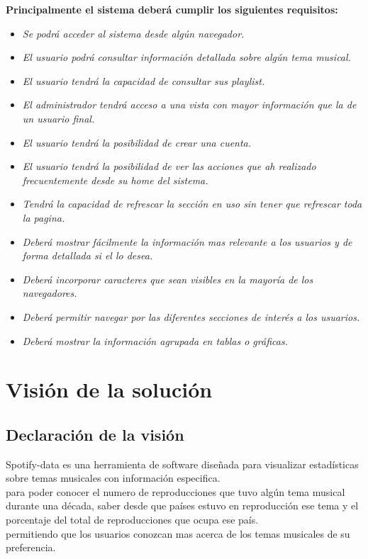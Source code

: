 \documentclass[12pt,a4paper]{book}
\begin{document}
\textbf{Principalmente el sistema deberá cumplir los siguientes requisitos: }
\vspace{0.5 cm}
\begin{itemize}
\item \textit{Se podrá acceder al sistema desde algún navegador.}
\item \textit{El usuario podrá consultar información detallada sobre algún tema musical.}
\item \textit{El usuario tendrá la capacidad de consultar sus playlist.}
\item \textit{El administrador tendrá acceso a una vista con mayor información que la de un usuario final.}
\item \textit{El usuario tendrá la posibilidad de crear una cuenta.}
\item \textit{El usuario tendrá la posibilidad de ver las acciones que ah realizado frecuentemente desde su home del sistema.}
\item \textit{Tendrá la capacidad de refrescar la sección en uso sin tener que refrescar toda la pagina.}
\item \textit{Deberá mostrar fácilmente la información mas relevante a los usuarios y de forma detallada si el lo desea.}
\item \textit{Deberá incorporar caracteres que sean visibles en la mayoría de los navegadores.}
\item \textit{Deberá permitir navegar por las diferentes secciones de interés a los usuarios.}
\item \textit{Deberá mostrar la información agrupada en tablas o gráficas.}
\end{itemize}

\chapter{Visión de la solución}

\section{Declaración de la visión}
\vspace{0.5 cm}
Spotify-data es una herramienta de software diseñada para visualizar estadísticas sobre temas musicales con información especifica.\\ 
para poder conocer el numero de reproducciones que tuvo algún tema musical durante una década, saber desde que países estuvo en reproducción ese tema y el porcentaje del total de reproducciones que ocupa ese país.\\ permitiendo que los usuarios conozcan mas acerca de los temas musicales de su preferencia.
\end{document}
